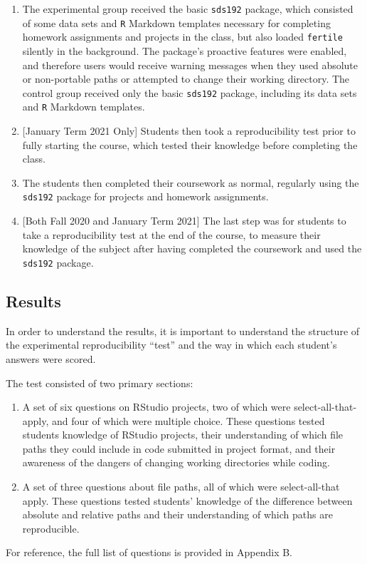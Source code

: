 \documentclass[12pt,twoside]{reedthesis}
\begin{document}
\begin{enumerate}
\def\labelenumi{\arabic{enumi}.}
\setcounter{enumi}{4}
\item
  The experimental group received the basic \texttt{sds192} package, which consisted of some data sets and \texttt{R} Markdown templates necessary for completing homework assignments and projects in the class, but also loaded \texttt{fertile} silently in the background. The package's proactive features were enabled, and therefore users would receive warning messages when they used absolute or non-portable paths or attempted to change their working directory. The control group received only the basic \texttt{sds192} package, including its data sets and \texttt{R} Markdown templates.
\item
  {[}January Term 2021 Only{]} Students then took a reproducibility test prior to fully starting the course, which tested their knowledge before completing the class.
\item
  The students then completed their coursework as normal, regularly using the \texttt{sds192} package for projects and homework assignments.
\item
  {[}Both Fall 2020 and January Term 2021{]} The last step was for students to take a reproducibility test at the end of the course, to measure their knowledge of the subject after having completed the coursework and used the \texttt{sds192} package.
\end{enumerate}
\hypertarget{results}{%
\subsection{Results}\label{results}}

In order to understand the results, it is important to understand the structure of the experimental reproducibility ``test'' and the way in which each student's answers were scored.

The test consisted of two primary sections:
\begin{enumerate}
\def\labelenumi{\arabic{enumi}.}
\item
  A set of six questions on RStudio projects, two of which were select-all-that-apply, and four of which were multiple choice. These questions tested students knowledge of RStudio projects, their understanding of which file paths they could include in code submitted in project format, and their awareness of the dangers of changing working directories while coding.
\item
  A set of three questions about file paths, all of which were select-all-that apply. These questions tested students' knowledge of the difference between absolute and relative paths and their understanding of which paths are reproducible.
\end{enumerate}
For reference, the full list of questions is provided in Appendix B.
\end{document}

